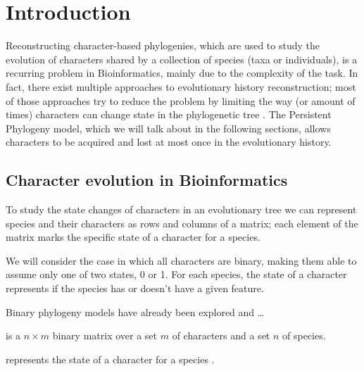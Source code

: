 
\section{Introduction}\label{section:introduction}


Reconstructing character-based phylogenies, which are used to study the evolution of characters shared by a collection of species (taxa or individuals),  is a recurring problem in Bioinformatics, mainly due to the complexity of the task. In fact,  there exist multiple approaches to evolutionary history reconstruction;  most of those approaches try to reduce the problem by limiting the way (or amount of times) characters can change state in the phylogenetic tree \cite{PPptime1994}.  The Persistent Phylogeny model, which we will talk about in the following sections, allows characters to be acquired and lost at most once in the evolutionary history.

\subsection{Character evolution in Bioinformatics}\label{section:character-evolution}


To study the state changes of characters in an evolutionary tree we can represent species and their characters as rows and columns of a matrix; each element of the matrix marks the specific state of a character for a species.

We will consider the case in which all characters are binary, making them able to assume only one of two states, 0 or 1. For each species, the state of a character represents if the species has or doesn't have a given feature.

 Binary phylogeny models have already been explored and \dots
{}

\begin{definition}\label{definition:m}
  \m{} is a $n \times m$ binary matrix over a set $m$ of characters and a set $n$ of species.

  \m[i][j] represents the state of a character \character[j] for a species \species[i].
\end{definition}

